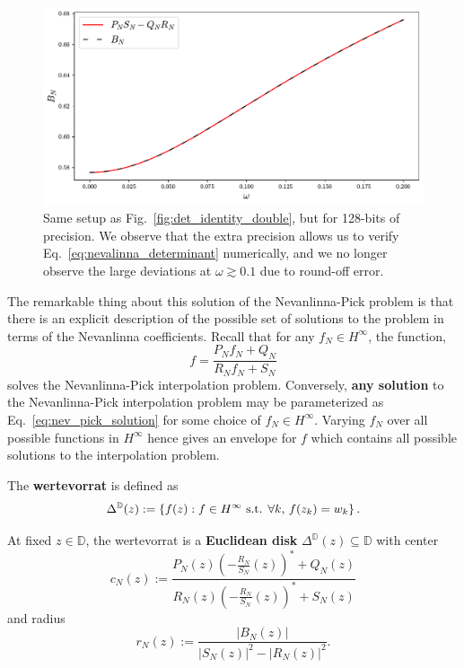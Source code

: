 \begin{figure}[!htp]
    \centering
    \includegraphics[width = \textwidth]{figs/det_identity_ext_prec.pdf}
    \caption{Same setup as Fig.~\ref{fig:det_identity_double}, but for 128-bits of precision. We observe that the extra precision allows us to verify Eq.~\eqref{eq:nevalinna_determinant} numerically, and we no longer observe the large deviations at $\omega\gtrsim 0.1$ due to round-off error.}
    \label{fig:det_identity_ext}
\end{figure}

The remarkable thing about this solution of the Nevanlinna-Pick problem is that there is an explicit description of the possible set of solutions to the problem in terms of the Nevanlinna coefficients. Recall that for any $f_N\in H^\infty$, the function,
\begin{equation}
    f = \frac{P_N f_N + Q_N}{R_N f_N + S_N}
    \label{eq:nev_pick_solution}
\end{equation}
solves the Nevanlinna-Pick interpolation problem. Conversely, \textbf{any solution} to the Nevanlinna-Pick interpolation problem may be parameterized as Eq.~\eqref{eq:nev_pick_solution} for some choice of $f_N\in H^\infty$. Varying $f_N$ over all possible functions in $H^\infty$ hence gives an envelope for $f$ which contains all possible solutions to the interpolation problem. 

The \textbf{wertevorrat} is defined as
\begin{equation}
    \Delta^{\mathbb D}(z) := \left\{ f(z) : f\in H^\infty \textnormal{ s.t. } \forall k,\, f(z_k) = w_k \right\}.
\end{equation}
\begin{theorem}
At fixed $z\in\mathbb D$, the wertevorrat is a \textbf{Euclidean disk} $\Delta^{\mathbb D}(z)\subseteq \mathbb D$ with center
\begin{equation}
    c_N(z) := \frac{P_N(z) \left( -\frac{R_N}{S_N}(z) \right)^* + Q_N(z)}{R_N(z) \left( -\frac{R_N}{S_N}(z) \right)^* + S_N(z)}
\end{equation}
and radius 
\begin{equation}
    r_N(z) := \frac{|B_N(z)|}{|S_N(z)|^2 - |R_N(z)|^2}.
\end{equation}
\end{theorem}

